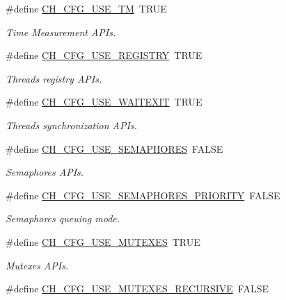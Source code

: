 \begin{DoxyCompactItemize}
\item 
\#define \hyperlink{group__config_ga1bd0fe5d119a7de890025214ae249c1d}{C\+H\+\_\+\+C\+F\+G\+\_\+\+U\+S\+E\+\_\+\+TM}~T\+R\+UE
\begin{DoxyCompactList}\small\item\em Time Measurement A\+P\+Is. \end{DoxyCompactList}\item 
\#define \hyperlink{group__config_gaefe648290026609c1a1ee2d687ff60c1}{C\+H\+\_\+\+C\+F\+G\+\_\+\+U\+S\+E\+\_\+\+R\+E\+G\+I\+S\+T\+RY}~T\+R\+UE
\begin{DoxyCompactList}\small\item\em Threads registry A\+P\+Is. \end{DoxyCompactList}\item 
\#define \hyperlink{group__config_ga2e46052c737bba99ac4b45f834149fc4}{C\+H\+\_\+\+C\+F\+G\+\_\+\+U\+S\+E\+\_\+\+W\+A\+I\+T\+E\+X\+IT}~T\+R\+UE
\begin{DoxyCompactList}\small\item\em Threads synchronization A\+P\+Is. \end{DoxyCompactList}\item 
\#define \hyperlink{group__config_gae66a111a6efc858624b42c8370b62cf6}{C\+H\+\_\+\+C\+F\+G\+\_\+\+U\+S\+E\+\_\+\+S\+E\+M\+A\+P\+H\+O\+R\+ES}~F\+A\+L\+SE
\begin{DoxyCompactList}\small\item\em Semaphores A\+P\+Is. \end{DoxyCompactList}\item 
\#define \hyperlink{group__config_ga04e4e037498950df8bdef88bdd199494}{C\+H\+\_\+\+C\+F\+G\+\_\+\+U\+S\+E\+\_\+\+S\+E\+M\+A\+P\+H\+O\+R\+E\+S\+\_\+\+P\+R\+I\+O\+R\+I\+TY}~F\+A\+L\+SE
\begin{DoxyCompactList}\small\item\em Semaphores queuing mode. \end{DoxyCompactList}\item 
\#define \hyperlink{group__config_ga7263b362a62e34158d09b44b4c204c27}{C\+H\+\_\+\+C\+F\+G\+\_\+\+U\+S\+E\+\_\+\+M\+U\+T\+E\+X\+ES}~T\+R\+UE
\begin{DoxyCompactList}\small\item\em Mutexes A\+P\+Is. \end{DoxyCompactList}\item 
\#define \hyperlink{group__config_gab9a61e9638af4b918ebad4e177dead4d}{C\+H\+\_\+\+C\+F\+G\+\_\+\+U\+S\+E\+\_\+\+M\+U\+T\+E\+X\+E\+S\+\_\+\+R\+E\+C\+U\+R\+S\+I\+VE}~F\+A\+L\+SE

\end{DoxyCompactItemize}
